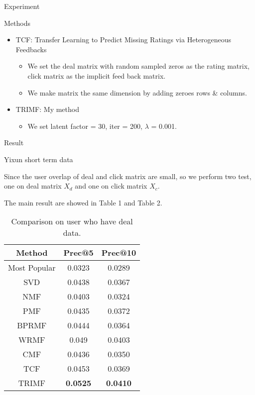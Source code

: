 \begin{section}{Experiment}
\begin{subsection}{Methods}
{\begin{itemize}
\begin{itemize}
    \item TCF:
Transfer Learning to Predict Missing Ratings via Heterogeneous Feedbacks
\begin{itemize}
\item We set the deal matrix with random sampled zeros as the rating matrix, click matrix as the implicit feed back matrix.
\item We make matrix the same dimension by adding zeroes rows \& columns.
\end{itemize}
\item TRIMF: My method
  \begin{itemize}
  \item We set latent factor = 30, iter = 200, $\lambda$ = 0.001.
  \end{itemize}
    \end{itemize}
  \end{itemize}
  
}
\end{subsection}
\begin{subsection}{Result}
  \begin{subsubsection}{Yixun short term data}
\par{Since the user overlap of deal and click matrix are small, so we perform two test, one on deal matrix $X_d$ and one on click matrix $X_c$.}
\par{The main result are showed in Table 1 and Table 2.}
\begin{table}
\begin{center}
  \begin{tabular}{|c|c|c|}
    \hline
    Method&Prec@5&Prec@10\\
    \hline
    Most Popular&0.0323&0.0289\\
    \hline
    SVD&0.0438&0.0367\\
    \hline
    NMF&0.0403&0.0324\\
    \hline
    PMF&0.0435&0.0372\\
    \hline
    BPRMF&0.0444&0.0364\\
    \hline
    WRMF&0.049&0.0403\\
    \hline
    CMF&0.0436&0.0350\\
    \hline
    TCF&0.0453&0.0369\\
    \hline
    TRIMF&\textbf{\color{red}0.0525}&\textbf{\color{red}0.0410}\\
    \hline
  \end{tabular}
\end{center}
\caption{Comparison on user who have deal data.}
\end{table}


\end{subsubsection}
\end{subsection}
\end{section}
